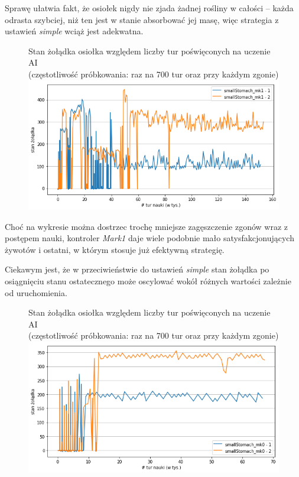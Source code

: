 Sprawę ułatwia fakt, że osiołek nigdy nie zjada żadnej rośliny w całości -- każda odrasta szybciej, niż ten jest w stanie absorbować jej masę, więc strategia z ustawień \textit{simple} wciąż jest adekwatna.

\begin{figure}[H]
    \centering
    \footnotesize{Stan żołądka osiołka względem liczby tur poświęconych na uczenie AI
    \\(częstotliwość próbkowania: raz na 700 tur oraz przy każdym zgonie)}
    \includegraphics[scale=0.6]{Chapters/smallStomach_mk1_hunger}
\end{figure}

Choć na wykresie można dostrzec trochę mniejsze zagęszczenie zgonów wraz z postępem nauki, kontroler \textit{Mark1} daje wiele podobnie mało satysfakcjonujących żywotów i ostatni, w którym stosuje już efektywną strategię.

Ciekawym jest, że w przeciwieństwie do ustawień \textit{simple} stan żołądka po osiągnięciu stanu ostatecznego może oscylować wokół różnych wartości zależnie od uruchomienia.

\begin{figure}[H]
    \centering
    \footnotesize{Stan żołądka osiołka względem liczby tur poświęconych na uczenie AI
    \\(częstotliwość próbkowania: raz na 700 tur oraz przy każdym zgonie)}
    \includegraphics[scale=0.6]{Chapters/smallStomach_mk0_hunger}
\end{figure}


